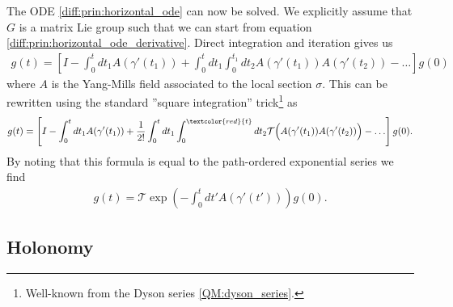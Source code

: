     \begin{method}
        The ODE \ref{diff:prin:horizontal_ode} can now be solved. We explicitly assume that $G$ is a matrix Lie group such that we can start from equation \ref{diff:prin:horizontal_ode_derivative}. Direct integration and iteration gives us
        \begin{gather}
            g(t) = \left[I - \int_0^tdt_1A(\gamma'(t_1)) + \int_0^tdt_1\int_0^{t_1}dt_2A(\gamma'(t_1))A(\gamma'(t_2))-\ldots\right]g(0)
        \end{gather}
        where $A$ is the Yang-Mills field associated to the local section $\sigma$. This can be rewritten using the standard ''square integration'' trick\footnote{Well-known from the Dyson series \ref{QM:dyson_series}.} as
        \begin{gather}
            g(t) = \left[I - \int_0^tdt_1A(\gamma'(t_1)) + \frac{1}{2!}\int_0^tdt_1\int_0^{\textcolor{red}{t}}dt_2\mathcal{T}\Big(A(\gamma'(t_1))A(\gamma'(t_2))\Big)-\ldots\right]g(0).
        \end{gather}
        By noting that this formula is equal to the path-ordered exponential series we find
        \begin{gather}
            g(t) = \mathcal{T}\exp\left(-\int_0^tdt'A(\gamma'(t'))\right)g(0).
        \end{gather}
    \end{method}


\subsection{Holonomy}

